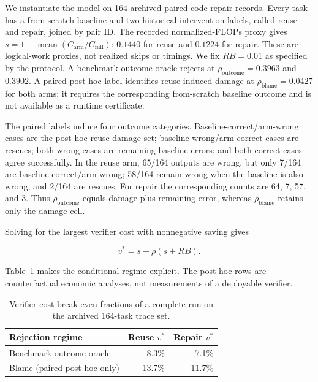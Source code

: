 \documentclass[letterpaper]{article} %
\begin{document}
We instantiate the model on 164 archived paired code-repair records. Every task
has a from-scratch baseline and two historical intervention labels, called
reuse and repair, joined by pair ID. The recorded normalized-FLOPs proxy gives
$s=1-\operatorname{mean}(C_{\mathrm{arm}}/C_{\mathrm{full}})$: $0.1440$ for
reuse and $0.1224$ for repair. These are logical-work proxies, not realized
skips or timings. We fix $RB=0.01$ as specified by the protocol. A benchmark
outcome oracle rejects at $\rho_{\mathrm{outcome}}=0.3963$ and $0.3902$. A
paired post-hoc label identifies reuse-induced damage at
$\rho_{\mathrm{blame}}=0.0427$ for both arms; it requires the corresponding
from-scratch baseline outcome and is not available as a runtime certificate.

The paired labels induce four outcome categories. Baseline-correct/arm-wrong
cases are the post-hoc reuse-damage set; baseline-wrong/arm-correct cases are
rescues; both-wrong cases are remaining baseline errors; and both-correct cases
agree successfully. In the reuse arm, 65/164 outputs are wrong, but only 7/164
are baseline-correct/arm-wrong; 58/164 remain wrong when the baseline is also
wrong, and 2/164 are rescues. For repair the corresponding counts are 64, 7,
57, and 3. Thus $\rho_{\mathrm{outcome}}$ equals damage plus remaining error,
whereas $\rho_{\mathrm{blame}}$ retains only the damage cell.

Solving for the largest verifier cost with nonnegative saving gives

\begin{equation}
v^{*}=s-\rho(s+RB).
\end{equation}

Table~\ref{tab:economics} makes the conditional regime explicit. The post-hoc
rows are counterfactual economic analyses, not measurements of a deployable
verifier.

\begin{table}[t]
\centering
\small
\setlength{\tabcolsep}{4pt}
\begin{tabular}{lrr}
\toprule
\textbf{Rejection regime} & \textbf{Reuse $v^{*}$} & \textbf{Repair $v^{*}$} \\
\midrule
Benchmark outcome oracle & 8.3\% & 7.1\% \\
Blame (paired post-hoc only) & 13.7\% & 11.7\% \\
\bottomrule
\end{tabular}
\caption{Verifier-cost break-even fractions of a complete run on the archived
164-task trace set.}
\label{tab:economics}
\end{table}
\end{document}
